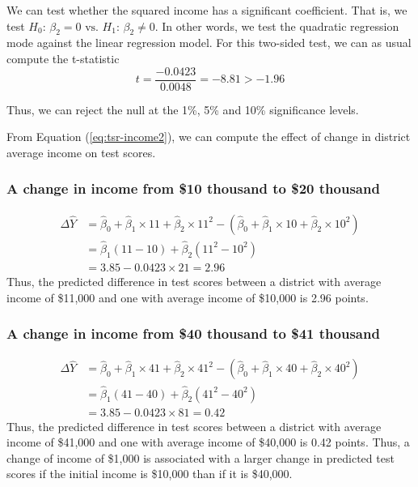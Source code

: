 \documentclass[a4paper,11pt]{article}
\begin{document}
We can test whether the squared income has a significant
coefficient. That is, we test \(H_0:\, \beta_2 = 0 \text{ vs. } H_1:\,
\beta_2 \neq 0\). In other words, we test the quadratic regression mode
against the linear regression model. For this two-sided test, we can
as usual compute the t-statistic
\[ t = \frac{-0.0423}{0.0048} = -8.81 > -1.96 \]

Thus, we can reject the null at the 1\%, 5\% and 10\% significance levels.

From Equation (\ref{eq:tsr-income2}), we can compute the effect of
change in district average income on test scores.

\subsubsection*{A change in income from \$10 thousand to \$20 thousand}
\label{sec:org38d83e3}
\begin{equation*}
\begin{split}
\Delta \hat{Y} &= \hat{\beta}_0 + \hat{\beta}_1 \times 11 + \hat{\beta}_2 \times 11^2 - (\hat{\beta}_0 + \hat{\beta}_1 \times 10 + \hat{\beta}_2 \times 10^2) \\
&= \hat{\beta}_1 (11 - 10) + \hat{\beta}_2(11^2 - 10^2) \\
& = 3.85 - 0.0423 \times 21 = 2.96
\end{split}
\end{equation*}
Thus, the predicted difference in test scores between a district with
average income of \$11,000 and one with average income of \$10,000 is
2.96 points.

\subsubsection*{A change in income from \$40 thousand to \$41 thousand}
\label{sec:org2f9d9fb}
\begin{equation*}
\begin{split}
\Delta \hat{Y} &= \hat{\beta}_0 + \hat{\beta}_1 \times 41 + \hat{\beta}_2 \times 41^2 - (\hat{\beta}_0 + \hat{\beta}_1 \times 40 + \hat{\beta}_2 \times 40^2) \\
&= \hat{\beta}_1 (41 - 40) + \hat{\beta}_2(41^2 - 40^2) \\
& = 3.85 - 0.0423 \times 81 = 0.42
\end{split}
\end{equation*}
Thus, the predicted difference in test scores between a district with
average income of \$41,000 and one with average income of \$40,000 is
0.42 points. Thus, a change of income of \$1,000 is associated with a
larger change in predicted test scores if the initial income is
\$10,000 than if it is \$40,000.
\end{document}
